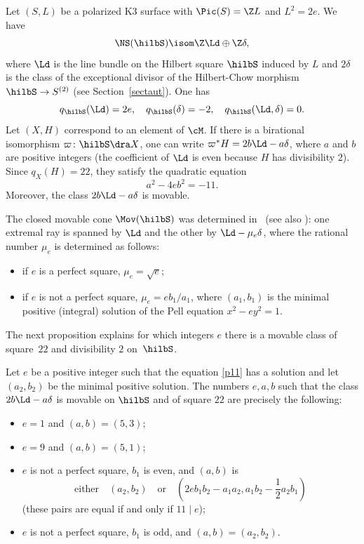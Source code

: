 \label{sect31}
Let $(S,L)$ be a polarized K3 surface with $\Pic(S)=\Z L$ and $L^2=2e$. We have
\[
\NS(\hilbS)\isom \Z \Ld \oplus \Z \delta,
\]
where $\Ld$ is
the line bundle on the Hilbert square $\hilbS $ induced by $L$ and $2\delta$ is the class of the exceptional divisor of the Hilbert-Chow morphism $\hilbS\to S^{(2)}$ (see Section~\ref{sectaut}). One has
\[
q_{\hilbS}(\Ld)=2e,\quad q_{\hilbS}(\delta)=-2,\quad q_{\hilbS}(\Ld,\delta)=0
.
\]
Let $(X,H)$ correspond to an element of $\cM$. If there is a birational isomorphism $\varpi\colon \hilbS\dra X$, one can write $\varpi^*H=2b\Ld -a\delta$, where $a$ and $b$ are positive integers (the coefficient of $\Ld $ is even because $H$ has divisibility $2$). Since $q_X(H)=22$, they satisfy the quadratic equation
\begin{equation}\label{p11}
a^2-4eb^2=-11.
\end{equation}
Moreover, the class $2b\Ld-a\delta$ is movable.

The closed movable cone $\Mov(\hilbS)$ was determined in~\cite{bama} (see also \cite[Ex.\,5.3]{dm}): one extremal ray is spanned by $\Ld$ and the other by $\Ld-\mu_e\delta$, where the rational number $\mu_e$ is determined as follows:
\begin{itemize}
\item if $e$ is a perfect square, $\mu_e=\sqrt{e}$;
\item if $e$ is not a perfect square, $\mu_e=eb_1/a_1$, where $(a_1,b_1)$ is the minimal positive (integral) solution of the Pell equation $x^2-ey^2=1$.
\end{itemize}

The next proposition explains for which integers $e$ there is a movable class of square~$22$ and divisibility $2$ on~$\hilbS $.

\begin{prop}\label{pr01}
Let $e$ be a positive integer such that the equation \eqref{p11} has a solution and let $(a_2,b_2)$ be the minimal positive solution. The numbers $ e,a,b $
such that the class $2b\Ld-a\delta$ is movable on $\hilbS$ and of square $22$ are precisely the following:
\begin{itemize}
\item $e=1$ and $(a,b)=(5,3)$;
\item $e=9$ and $(a,b)=(5,1)$;
\item $e$ is not a perfect square, $b_1$ is even, and $(a,b)$ is
\[
\text{either}\quad(a_2,b_2)\quad\text{or}\quad (2eb_1b_2-a_1a_2,a_1b_2 -\frac12a_2b_1)
\]
(these pairs are equal if and only if $11\mid e$);
\item $e$ is not a perfect square, $b_1$ is odd, and $(a,b)=(a_2,b_2)$.
\end{itemize}
\end{prop}

